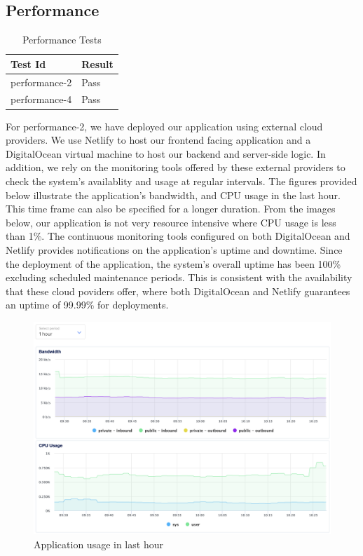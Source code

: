 \documentclass[12pt, titlepage]{article}
\begin{document}
\subsection{Performance}

\begin{center}
\begin{longtable}{|p{4cm} | p{4cm}| }
\caption{Performance Tests}
\hline
\textbf{Test Id} & \textbf{Result} \\
\hline
performance-2 & Pass \\
\hline
performance-4 & Pass \\
\hline

\end{longtable}
\end{center}

For performance-2, we have deployed our application using external cloud providers. We use Netlify to host our frontend facing application and a DigitalOcean virtual machine to host our backend and server-side logic. In addition, we rely on the monitoring tools offered by these external providers to check the system's availablity and usage at regular intervals. The figures provided below illustrate the application's bandwidth, and CPU usage in the last hour. This time frame can also be specified for a longer duration. From the images below, our application is not very resource intensive where CPU usage is less than 1\%. The continuous monitoring tools configured on both DigitalOcean and Netlify provides notifications on the application's uptime and downtime. Since the deployment of the application, the system's overall uptime has been 100\% excluding scheduled maintenance periods. This is consistent with the availability that these cloud poviders offer, where both DigitalOcean and Netlify guarantees an uptime of 99.99\% for deployments.

\begin{figure}[h]
\centering
\includegraphics[width=1\textwidth]{performance-metrics.png}
\caption{Application usage in last hour}
\label{fig:myimage}
\end{figure}
\end{document}
